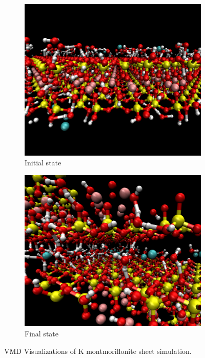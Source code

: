 		\begin{figure}
			\centering
			\begin{subfigure}{0.5\textwidth}
				\centering
				\includegraphics[scale=0.22]{images/mont_init.png}
				\caption{Initial state}
			\end{subfigure}%
			\begin{subfigure}{0.5\textwidth}
				\centering
				\includegraphics[scale=0.22]{images/mont_fin.png}
				\caption{Final state}
			\end{subfigure}
			\caption{VMD Visualizations of K montmorillonite sheet simulation.}
			\label{fig:mont_visual}
		\end{figure}
		
				
			
			


